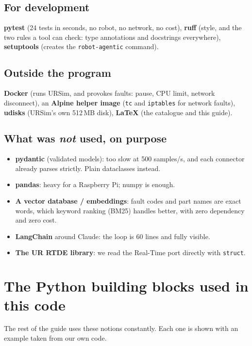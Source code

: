 \documentclass[10pt]{article}
\newcommand{\brkus}{\textunderscore\allowbreak}
\newcommand{\f}[1]{\texttt{\let\_\brkus #1}}
\begin{document}
\subsection{For development}
\textbf{pytest} (24 tests in seconds, no robot, no network, no cost), \textbf{ruff} (style, and the
two rules a tool can check: type annotations and docstrings everywhere), \textbf{setuptools}
(creates the \f{robot-agentic} command).

\subsection{Outside the program}
\textbf{Docker} (runs URSim, and provokes faults: pause, CPU limit, network disconnect), an
\textbf{Alpine helper image} (\f{tc} and \f{iptables} for network faults), \textbf{udisks}
(URSim's own 512\,MB disk), \textbf{LaTeX} (the catalogue and this guide).

\subsection{What was \emph{not} used, on purpose}
\begin{itemize}
\item \textbf{pydantic} (validated models): too slow at 500 samples/s, and each connector already parses strictly. Plain dataclasses instead.
\item \textbf{pandas}: heavy for a Raspberry Pi; numpy is enough.
\item \textbf{A vector database / embeddings}: fault codes and part names are exact words, which keyword ranking (BM25) handles better, with zero dependency and zero cost.
\item \textbf{LangChain} around Claude: the loop is 60 lines and fully visible.
\item \textbf{The UR RTDE library}: we read the Real-Time port directly with \f{struct}.
\end{itemize}

\section{The Python building blocks used in this code}\label{sec:python}

The rest of the guide uses these notions constantly. Each one is shown with an example taken
from our own code.
\end{document}
